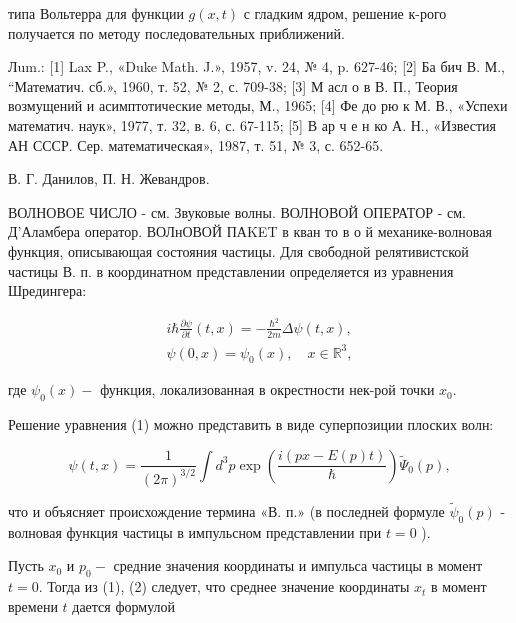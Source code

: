 \documentclass[10pt]{article}
\begin{document}
типа Вольтерра для функции $g(x, t)$ с гладким ядром, решение к-рого получается по методу последовательных приближений.



Лum.: [1] Lax P., «Duke Math. J.», 1957, v. 24, № 4, p. 627-46; [2] Ба бич В. М., “Математич. сб.», 1960, т. 52, № 2, с. 709-38; [3] М асл о в В. П., Теория возмущений и асимптотические методы, М., 1965; [4] Фе до рю к М. В., «Успехи математич. наук», 1977, т. 32, в. 6, с. 67-115; [5] В ар ч е н ко А. Н., «Известия АН СССР. Сер. математическая», 1987, т. 51, № 3, с. 652-65.



В. Г. Данилов, П. Н. Жевандров.



ВОЛНОВОЕ ЧИСЛО - см. Звуковые волны. ВОЛНОВОЙ ОПЕРАТОР - см. Д'Аламбера оператор. ВОЛнОВОЙ ПАKET в кван то в о й механике-волновая функция, описывающая состояния частицы. Для свободной релятивистской частицы В. п. в координатном представлении определяется из уравнения Шредингера:



\[

\begin{gathered}

i \hbar \frac{\partial \psi}{\partial t}(t, x)=-\frac{\hbar^{2}}{2 m} \Delta \psi(t, x), \\

\psi(0, x)=\psi_{0}(x), \quad x \in \mathbb{R}^{3},

\end{gathered}

\]



где $\psi_{0}(x)-$ функция, локализованная в окрестности нек-рой точки $x_{0}$.



Решение уравнения (1) можно представить в виде суперпозиции плоских волн:



\[

\psi(t, x)=\frac{1}{(2 \pi)^{3 / 2}} \int d^{3} p \exp \left(\frac{i(p x-E(p) t)}{\hbar}\right) \tilde{\Psi}_{0}(p),

\]



что и объясняет происхождение термина «В. п.» (в последней формуле $\tilde{\psi}_{0}(p)$ - волновая функция частицы в импульсном представлении при $t=0$ ).



Пусть $x_{0}$ и $p_{0}-$ средние значения координаты и импульса частицы в момент $t=0$. Тогда из (1), (2) следует, что среднее значение координаты $x_{t}$ в момент времени $t$ дается формулой
\end{document}
